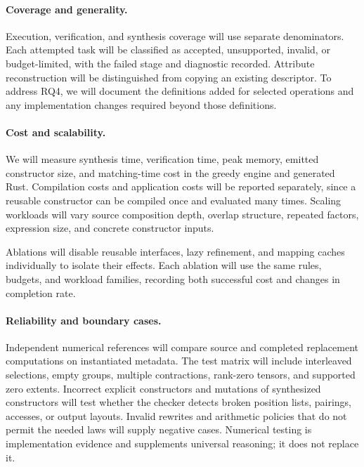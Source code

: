 \paragraph{Coverage and generality.}
Execution, verification, and synthesis coverage will use separate denominators.
Each attempted task will be classified as accepted, unsupported, invalid,
or budget-limited, with the failed stage and diagnostic recorded. Attribute
reconstruction will be distinguished from copying an existing descriptor.
To address RQ4, we will document the definitions added for selected operations
and any implementation changes required beyond those definitions.

\paragraph{Cost and scalability.}
We will measure synthesis time, verification time, peak memory, emitted
constructor size, and matching-time cost in the greedy engine and generated
Rust. Compilation costs and application costs will be reported separately,
since a reusable constructor can be compiled once and evaluated many times.
Scaling workloads will vary source composition depth, overlap structure,
repeated factors, expression size, and concrete constructor inputs.

Ablations will disable reusable interfaces, lazy refinement, and mapping
caches individually to isolate their effects. Each ablation will use the same
rules, budgets, and workload families, recording both successful cost and
changes in completion rate. 

\paragraph{Reliability and boundary cases.}
Independent numerical references will compare source and completed replacement
computations on instantiated metadata. The test matrix will include interleaved
selections, empty groups, multiple contractions, rank-zero tensors, and
supported zero extents. Incorrect explicit constructors and mutations of
synthesized constructors will test whether the checker detects broken position
lists, pairings, accesses, or output layouts. Invalid rewrites and arithmetic
policies that do not permit the needed laws will supply negative cases.
Numerical testing is implementation evidence and supplements universal
reasoning; it does not replace it. 

